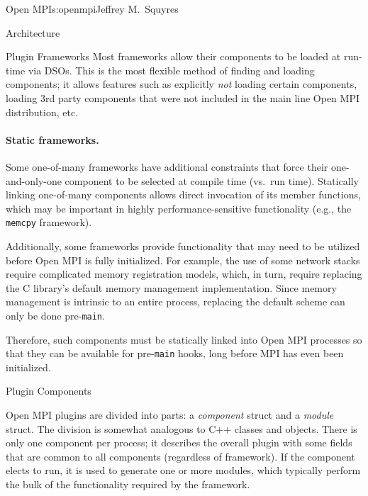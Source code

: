 \begin{aosachapter}{Open MPI}{s:openmpi}{Jeffrey M.\ Squyres}
\begin{aosasect1}{Architecture}
\begin{aosasect2}{Plugin Frameworks}
Most frameworks allow their components to be loaded at run-time via
DSOs.  This is the most flexible method of finding and loading
components; it allows features such as explicitly {\em not} loading
certain components, loading 3rd party components that were not
included in the main line Open MPI distribution, etc.


\paragraph{Static frameworks.} 

Some one-of-many frameworks have additional constraints that force
their one-and-only-one component to be selected at compile time (vs.\
run time).  Statically linking one-of-many components allows direct
invocation of its member functions, which may be important in highly
performance-sensitive functionality (e.g., the {\tt memcpy} framework).

Additionally, some frameworks provide functionality that may need to
be utilized before Open MPI is fully initialized.  
%
For example, the use of some network stacks require complicated memory
registration models, which, in turn, require replacing the C library's
default memory management implementation.  
%
Since memory management is intrinsic to an entire process, replacing
the default scheme can only be done pre-{\tt main}.

Therefore, such components must be statically linked into Open MPI
processes so that they can be available for pre-{\tt main} hooks, long
before MPI has even been initialized.

\end{aosasect2}


\begin{aosasect2}{Plugin Components}

Open MPI plugins are divided into parts: a {\em component} struct
and a {\em module} struct.
%
The division is somewhat analogous to C++ classes and objects.
%
There is only one component per process; it describes the overall
plugin with some fields that are common to all components (regardless
of framework).
%
If the component elects to run, it is used to generate one or more
modules, which typically perform the bulk of the functionality
required by the framework.



\end{aosasect2}
\end{aosasect1}
\end{aosachapter}
